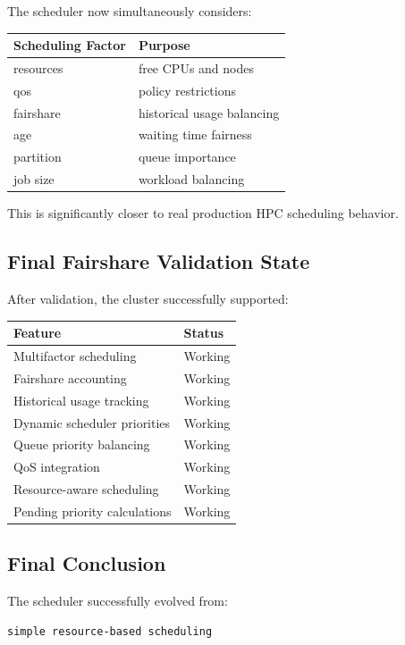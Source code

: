 \documentclass[11pt]{article}
\begin{document}
The scheduler now simultaneously considers:

\begin{center}
\begin{tabular}{ll}
Scheduling Factor & Purpose\\
\hline
resources & free CPUs and nodes\\
qos & policy restrictions\\
fairshare & historical usage balancing\\
age & waiting time fairness\\
partition & queue importance\\
job size & workload balancing\\
\end{tabular}
\end{center}

This is significantly closer to real production HPC scheduling behavior.
\subsection{Final Fairshare Validation State}
\label{sec:org45cd140}

After validation, the cluster successfully supported:

\begin{center}
\begin{tabular}{ll}
Feature & Status\\
\hline
Multifactor scheduling & Working\\
Fairshare accounting & Working\\
Historical usage tracking & Working\\
Dynamic scheduler priorities & Working\\
Queue priority balancing & Working\\
QoS integration & Working\\
Resource-aware scheduling & Working\\
Pending priority calculations & Working\\
\end{tabular}
\end{center}
\subsection{Final Conclusion}
\label{sec:org34e22d3}

The scheduler successfully evolved from:

\begin{verbatim}
simple resource-based scheduling
\end{verbatim}
\end{document}
